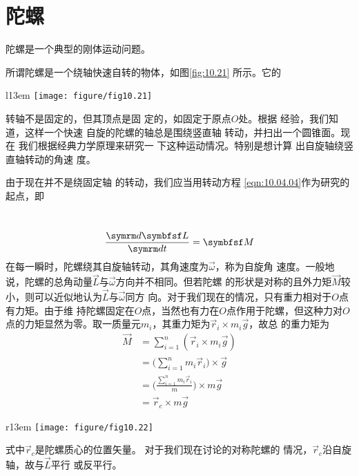 \section[陀螺]{陀\qquad 螺}\label{sec:10.05}

陀螺是一个典型的刚体运动问题。

所谓陀螺是一个绕轴快速自转的物体，如图\ref{fig:10.21} 所示。它的
\begin{wrapfigure}[12]{l}{13em}
    \centering
    \texttt{[image: figure/fig10.21]}
    \caption{陀螺}
    \label{fig:10.21}
\end{wrapfigure}
转轴不是固定的，但其顶点是固
定的，如固定于原点$ O $处。根据
经验，我们知道，这样一个快速
自旋的陀螺的轴总是围绕竖直轴
转动，并扫出一个圆锥面。现在
我们根据经典力学原理来研究一
下这种运动情况。特别是想计算
出自旋轴绕竖直轴转动的角速
度。

由于现在并不是绕固定轴
的转动，我们应当用转动方程
\eqref{eqn:10.04.04}作为研究的起点，即

\clearpage~\vspace{-1.56em}
\begin{equation}\label{eqn:10.05.01}
    \frac {  \dif \vec{L} } {  \dif t } = \vec{M}
\end{equation}
在每一瞬时，陀螺绕其自旋轴转动，其角速度为$ \vec{\omega} $，称为自旋角
速度。一般地说，陀螺的总角动量$\vec{L}$与$\vec{\omega}$方向并不相同。但若陀螺
的形状是对称的且外力矩$\vec{M}$较小，则可以近似地认为$\vec{L}$与$\vec{\omega}$同方
向。对于我们现在的情况，只有重力相对于$ O $点有力矩。由于维
持陀螺固定在$ O $点，当然也有力在$ O $点作用于陀螺，但这种力对$ O $
点的力矩显然为零。取一质量元$ m _ i $，其重力矩为$  \vec{r} _ { i } \times m _ { i } \vec{g}   $，故总
的重力矩为
\begin{equation*}
    \begin{split}
        \vec{M} &= \sum_{ i = 1 } ^ n \left( \vec{r} _ i \times m _ { i } \vec{g} \right) \\
                &= \Bigg( \sum_{ i = 1 } ^ n m _ i \vec{r} _ { i } \Bigg) \times \vec{g} \\
                &= \Bigg( \frac { \sum _{ i = 1 } ^ n m _ i \vec{r} _ i } { m } \Bigg) \times m \vec{g} \\
                &= \vec{r} _ { c } \times m \vec{g}
    \end{split}
\end{equation*}
\begin{wrapfigure}[12]{r}{13em}
    \vspace{-1em}
    \centering
    \texttt{[image: figure/fig10.22]}
    \caption{陀螺的动力学}
    \label{fig:10.22}
\end{wrapfigure}
式中$ \vec{r} _ c $是陀螺质心的位置矢量。
对于我们现在讨论的对称陀螺的
情况，$ \vec{r} _ c $沿自旋轴，故与$ \vec{L} $平行
或反平行。

